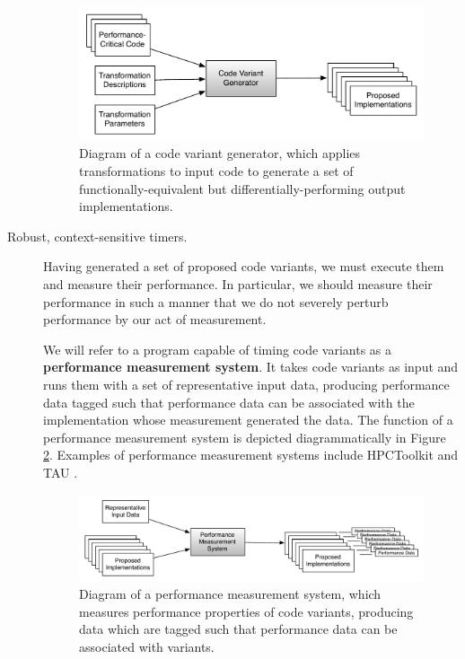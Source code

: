 \documentclass[msthesis,justified,copyright,final,numbers,sort&compress,
gsmodern,amstex,natbib]{uothesis}
\begin{document}
\begin{description}
\begin{figure}[tbp]
\centering
\includegraphics[width=\textwidth]{variant.pdf}
\caption[Diagram of a code variant generator]{Diagram of a code variant generator, which applies transformations to input code to generate a set of functionally-equivalent but differentially-performing output implementations.}
\label{fig:variant}
\end{figure}

\item[Robust, context-sensitive timers.]

Having generated a set of proposed code variants, we must execute them and measure their performance. In particular, we should measure their performance in such a manner that we do not severely perturb performance by our act of measurement.

We will refer to a program capable of timing code variants as a \textbf{performance measurement system}. It takes code variants as input and runs them with a set of representative input data, producing performance data tagged such that performance data can be associated with the implementation whose measurement generated the data. The function of a performance measurement system is depicted diagrammatically in Figure \ref{fig:performance}. Examples of performance measurement systems include HPCToolkit \cite{hpctoolkit} and TAU \cite{tau}.

\begin{figure}[tbp]
\centering
\includegraphics[width=\textwidth]{performance.pdf}
\caption[Diagram of a performance measurement system]{Diagram of a performance measurement system, which measures performance properties of code variants, producing data which are tagged such that performance data can be associated with variants.}
\label{fig:performance}
\end{figure}


\end{description}
\end{document}
